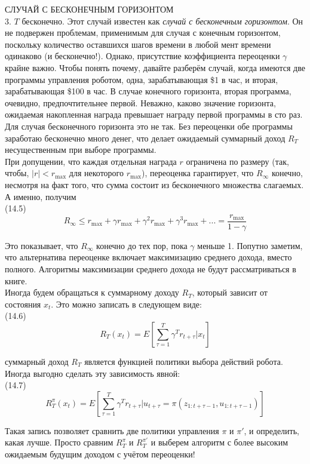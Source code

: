 \documentclass[10pt,a4paper]{article}
\begin{document}
СЛУЧАЙ С БЕСКОНЕЧНЫМ ГОРИЗОНТОМ\\

3.	$T$ бесконечно. Этот случай известен как \textit{случай с бесконечным горизонтом}. Он не подвержен проблемам, применимым для случая с конечным горизонтом, поскольку количество оставшихся шагов времени в любой мент времени одинаково (и бесконечно!). Однако, присутствие коэффициента переоценки $\gamma$ крайне важно. Чтобы понять почему, давайте разберём случай, когда имеются две программы управления роботом, одна, зарабатывающая \$1 в час, и вторая, зарабатывающая \$100 в час. В случае конечного горизонта, вторая программа, очевидно, предпочтительнее первой. Неважно, каково значение горизонта, ожидаемая накопленная награда превышает награду первой программы в сто раз. Для случая бесконечного горизонта это не так. Без переоценки обе программы заработаю бесконечно много денег, что делает ожидаемый суммарный доход $R_T$ несущественным при выборе программы.\\

При допущении, что каждая отдельная награда $r$ ограничена по размеру (так, чтобы, $|r|<r_{\max}$ для некоторого $r_{\max}$), переоценка гарантирует, что $R_\infty$ конечно, несмотря на факт того, что сумма состоит из бесконечного множества слагаемых. А именно, получим\\

(14.5)
$$R_\infty\leq r_{\max}+\gamma r_{\max}+\gamma^2r_{\max}+\gamma^3r_{\max}+...=\frac{r_{\max}}{1-\gamma}$$

Это показывает, что $R_\infty$ конечно до тех пор, пока $\gamma$ меньше 1. Попутно заметим, что альтернатива переоценке включает максимизацию среднего дохода, вместо полного. Алгоритмы максимизации среднего дохода не будут рассматриваться в книге.\\

Иногда будем обращаться к суммарному доходу $R_T$, который  зависит от состояния $x_t$. Это можно записать в следующем виде:\\

(14.6)
$$R_T(x_t)=E\left[\sum_{\tau=1}^T \gamma^Tr_{t+\tau}|x_t\right]$$ 

суммарный доход $R_T$ является функцией политики выбора действий робота. Иногда выгодно сделать эту зависимость явной:\\

(14.7)
$$R_T^\pi(x_t)=E\left[\sum_{\tau=1}^T \gamma^Tr_{t+\tau}|u_{t+\tau}=\pi(z_{1:t+\tau-1},u_{1:t+\tau-1})\right]$$

Такая запись позволяет сравнить две политики управления $\pi$ и $\pi'$, и определить, какая лучше. Просто сравним $R_T^\pi$ и $R_T^{\pi'}$  и выберем алгоритм с более высоким ожидаемым будущим доходом с учётом переоценки!\\
\end{document}
